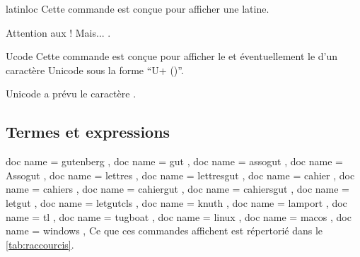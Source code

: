 \documentclass{letgut}
\begin{document}
\begin{docCommand}{latinloc}{}
  Cette commande est conçue pour afficher une  latine.
\end{docCommand}

\begin{ltx-code-result}[title addon=locutions étrangères,listing options app={deletekeywords={[3]{options}}}]
Attention aux  !
Mais... .
\end{ltx-code-result}

\begin{docCommand}{Ucode}{}
  Cette commande est conçue pour afficher le  et
  éventuellement le  d'un caractère Unicode sous la forme
  \enquote{U+ ()}.
\end{docCommand}

\begin{ltx-code-result}[title addon=Point de code d'un caractère Unicode,listing options app={deletekeywords={[3]{options}}}]
Unicode a prévu le caractère .
\end{ltx-code-result}

\subsection{Termes et expressions}
\label{sec:termes}

\begin{docCommands}
  {
    { doc name = gutenberg },
    { doc name = gut },
    { doc name = assogut },
    { doc name = Assogut },
    { doc name = lettres },
    { doc name = lettresgut },
    { doc name = cahier },
    { doc name = cahiers },
    { doc name = cahiergut },
    { doc name = cahiersgut },
    { doc name = letgut },
    { doc name = letgutcls },
    { doc name = knuth },
    { doc name = lamport },
    { doc name = tl },
    { doc name = tugboat },
    { doc name = linux },
    { doc name = macos },
    { doc name = windows },
  }
  Ce que ces commandes affichent est répertorié dans le \vref{tab:raccourcis}.
\end{docCommands}
\end{document}

